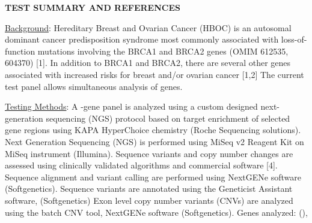 \documentclass[10pt]{article}
\newcommand{\data}[1]{}
\newenvironment{dataiter}[1]{}{}
\begin{document}
{\bf TEST SUMMARY AND REFERENCES}

\hfill \parbox{19cm}{
\underline{Background}: Hereditary Breast and Ovarian Cancer (HBOC) is an autosomal dominant cancer predisposition syndrome most commonly associated with loss-of-function mutations involving the BRCA1 and BRCA2 genes (OMIM 612535, 604370) [1]. In addition to BRCA1 and BRCA2, there are several other genes associated with increased risks for breast and/or ovarian cancer [1,2] The current test panel allows simultaneous analysis of \data{num_tested_genes} genes.

\vspace{1em}
\underline{Testing Methods}: A \data{num_tested_genes}-gene panel is analyzed using a custom designed next-generation sequencing (NGS) protocol based on target enrichment of selected gene regions using KAPA HyperChoice chemistry (Roche Sequencing solutions). Next Generation Sequencing (NGS) is performed using MiSeq v2 Reagent Kit on MiSeq instrument (Illumina). Sequence variants and copy number changes are assessed using clinically validated algorithms and commercial software [4]. Sequence alignment and variant calling are performed using NextGENe software (Softgenetics). Sequence variants are annotated using the Geneticist Assistant software, (Softgenetics) Exon level copy number variants (CNVs) are analyzed using the batch CNV tool, NextGENe software (Softgenetics).
Genes analyzed: \begin{dataiter}{tested_genes}\data{gene_symbol}(\data{refseq_mrna}), \end{dataiter}
}
\end{document}
